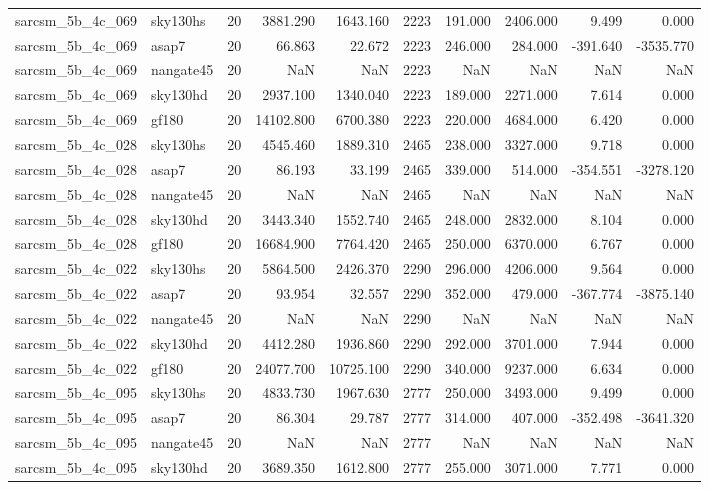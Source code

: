 \documentclass{article}
\begin{document}
\begin{longtable}{llrrrrrrrr}
sarcsm\_5b\_4c\_069 & sky130hs & 20 & 3881.290 & 1643.160 & 2223 & 191.000 & 2406.000 & 9.499 & 0.000 \\
sarcsm\_5b\_4c\_069 & asap7 & 20 & 66.863 & 22.672 & 2223 & 246.000 & 284.000 & -391.640 & -3535.770 \\
sarcsm\_5b\_4c\_069 & nangate45 & 20 & NaN & NaN & 2223 & NaN & NaN & NaN & NaN \\
sarcsm\_5b\_4c\_069 & sky130hd & 20 & 2937.100 & 1340.040 & 2223 & 189.000 & 2271.000 & 7.614 & 0.000 \\
sarcsm\_5b\_4c\_069 & gf180 & 20 & 14102.800 & 6700.380 & 2223 & 220.000 & 4684.000 & 6.420 & 0.000 \\
sarcsm\_5b\_4c\_028 & sky130hs & 20 & 4545.460 & 1889.310 & 2465 & 238.000 & 3327.000 & 9.718 & 0.000 \\
sarcsm\_5b\_4c\_028 & asap7 & 20 & 86.193 & 33.199 & 2465 & 339.000 & 514.000 & -354.551 & -3278.120 \\
sarcsm\_5b\_4c\_028 & nangate45 & 20 & NaN & NaN & 2465 & NaN & NaN & NaN & NaN \\
sarcsm\_5b\_4c\_028 & sky130hd & 20 & 3443.340 & 1552.740 & 2465 & 248.000 & 2832.000 & 8.104 & 0.000 \\
sarcsm\_5b\_4c\_028 & gf180 & 20 & 16684.900 & 7764.420 & 2465 & 250.000 & 6370.000 & 6.767 & 0.000 \\
sarcsm\_5b\_4c\_022 & sky130hs & 20 & 5864.500 & 2426.370 & 2290 & 296.000 & 4206.000 & 9.564 & 0.000 \\
sarcsm\_5b\_4c\_022 & asap7 & 20 & 93.954 & 32.557 & 2290 & 352.000 & 479.000 & -367.774 & -3875.140 \\
sarcsm\_5b\_4c\_022 & nangate45 & 20 & NaN & NaN & 2290 & NaN & NaN & NaN & NaN \\
sarcsm\_5b\_4c\_022 & sky130hd & 20 & 4412.280 & 1936.860 & 2290 & 292.000 & 3701.000 & 7.944 & 0.000 \\
sarcsm\_5b\_4c\_022 & gf180 & 20 & 24077.700 & 10725.100 & 2290 & 340.000 & 9237.000 & 6.634 & 0.000 \\
sarcsm\_5b\_4c\_095 & sky130hs & 20 & 4833.730 & 1967.630 & 2777 & 250.000 & 3493.000 & 9.499 & 0.000 \\
sarcsm\_5b\_4c\_095 & asap7 & 20 & 86.304 & 29.787 & 2777 & 314.000 & 407.000 & -352.498 & -3641.320 \\
sarcsm\_5b\_4c\_095 & nangate45 & 20 & NaN & NaN & 2777 & NaN & NaN & NaN & NaN \\
sarcsm\_5b\_4c\_095 & sky130hd & 20 & 3689.350 & 1612.800 & 2777 & 255.000 & 3071.000 & 7.771 & 0.000 \\

\end{longtable}
\end{document}
